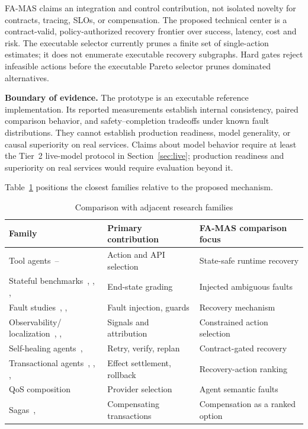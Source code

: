 \documentclass[10pt,journal,compsoc]{IEEEtran}
\newcommand{\famas}{FA-MAS}
\begin{document}
\famas{} claims an integration and control contribution, not isolated novelty for contracts, tracing, SLOs, or compensation. The proposed technical center is a contract-valid, policy-authorized recovery frontier over success, latency, cost and risk. The executable selector currently prunes a finite set of single-action estimates; it does not enumerate executable recovery subgraphs. Hard gates reject infeasible actions before the executable Pareto selector prunes dominated alternatives.

\textbf{Boundary of evidence.} The prototype is an executable reference implementation. Its reported measurements establish internal consistency, paired comparison behavior, and safety--completion tradeoffs under known fault distributions. They cannot establish production readiness, model generality, or causal superiority on real services. Claims about model behavior require at least the Tier~2 live-model protocol in Section~\ref{sec:live}; production readiness and superiority on real services would require evaluation beyond it.

Table~\ref{tab:families} positions the closest families relative to the proposed mechanism.

\begin{table}[!t]
\centering
\caption{Comparison with adjacent research families}\label{tab:families}
\footnotesize
\begin{tabular}{@{}p{}p{}p{}@{}}
\toprule
Family & Primary contribution & \famas{} comparison focus\\
\midrule
Tool agents~\cite{yao2023react}--\cite{kim2024llmcompiler} & Action and API selection & State-safe runtime recovery\\
Stateful benchmarks~\cite{yao2025taubench}, \cite{barres2026tau2}, \cite{lu2025toolsandbox}, \cite{trivedi2024appworld} & End-state grading & Injected ambiguous faults\\
Fault studies~\cite{gupta2026reliabilitybench}, \cite{li2026exactlyonce}, \cite{mansoor2026verified} & Fault injection, guards & Recovery mechanism\\
Observability/ localization~\cite{li2026wasted}, \cite{zhang2025whichagent}, \cite{xia2026agentlocate} & Signals and attribution & Constrained action selection\\
Self-healing agents~\cite{babu2026selfhealing}, \cite{jeong2026selfhealing} & Retry, verify, replan & Contract-gated recovery\\
Transactional agents~\cite{chang2025sagallm}, \cite{mohammadi2026atomix}, \cite{chen2026cordon}, \cite{yang2026dart} & Effect settlement, rollback & Recovery-action ranking\\
QoS composition~\cite{zeng2004qos} & Provider selection & Agent semantic faults\\
Sagas~\cite{garcia1987sagas}, \cite{wsba2009} & Compensating transactions & Compensation as a ranked option\\
\bottomrule
\end{tabular}
\end{table}
\end{document}
